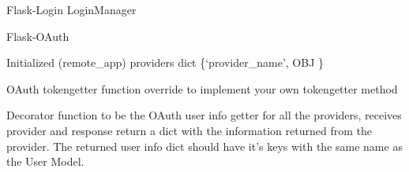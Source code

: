 \documentclass[letterpaper,10pt,english]{sphinxmanual}
\begin{document}
\begin{fulllineitems}
\begin{fulllineitems}
\begin{quote}
\begin{description}
\begin{itemize}
\end{itemize}

\end{description}\end{quote}

\end{fulllineitems}


\begin{fulllineitems}
\label{api:flask.ext.appbuilder.security.manager.BaseSecurityManager.lm}
Flask-Login LoginManager

\end{fulllineitems}


\begin{fulllineitems}
\label{api:flask.ext.appbuilder.security.manager.BaseSecurityManager.oauth}
Flask-OAuth

\end{fulllineitems}


\begin{fulllineitems}
\label{api:flask.ext.appbuilder.security.manager.BaseSecurityManager.oauth_remotes}
Initialized (remote\_app) providers dict \{`provider\_name', OBJ \}

\end{fulllineitems}


\begin{fulllineitems}
\label{api:flask.ext.appbuilder.security.manager.BaseSecurityManager.oauth_tokengetter}
OAuth tokengetter function override to implement your own tokengetter method

\end{fulllineitems}


\begin{fulllineitems}
\label{api:flask.ext.appbuilder.security.manager.BaseSecurityManager.oauth_user_info_getter}
Decorator function to be the OAuth user info getter
for all the providers, receives provider and response 
return a dict with the information returned from the provider.
The returned user info dict should have it's keys with the same
name as the User Model.


\end{fulllineitems}
\end{fulllineitems}
\end{document}
